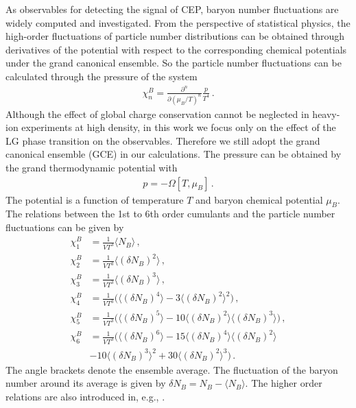 \documentclass[aps,twocolumn,prd,superscriptaddress,nofootinbib,floatfix]{revtex4-2}
\begin{document}
As observables for detecting the signal of CEP, baryon number fluctuations are widely computed and investigated. From the perspective of statistical physics, the high-order fluctuations of particle number distributions can be obtained through derivatives of the potential with respect to the corresponding chemical potentials under the grand canonical ensemble. So the particle number fluctuations can be calculated through the pressure of the system
%
\begin{align}\label{eq:chi}
\chi^B_n=\frac{\partial^n}{\partial(\mu_B/T)^n}\frac{p}{T^4}\,.
\end{align}
%
Although the effect of global charge conservation cannot be neglected in heavy-ion experiments at high density, in this work we focus only on the effect of the LG phase transition on the observables. Therefore we still adopt the grand canonical ensemble (GCE) in our calculations. The pressure can be obtained by the grand thermodynamic potential with 
%
\begin{align}\label{eq:p_omega}
p=-\Omega[T,\mu_B]\,.
\end{align}
%
The potential is a function of temperature $T$ and baryon chemical potential $\mu_B$. The relations between the 1st to 6th order cumulants and the particle number fluctuations can be given by
%
\begin{align}
    \chi^B_1&=\frac{1}{VT^3}\langle N_B\rangle\,,\\[2ex]
    \chi^B_2&=\frac{1}{VT^3}\langle (\delta N_B)^2\rangle\,,\\[2ex]
    \chi^B_3&=\frac{1}{VT^3}\langle (\delta N_B)^3\rangle\,,\\[2ex]
    \chi^B_4&=\frac{1}{VT^3}\bigg(\langle (\delta N_B)^4\rangle-3\langle (\delta N_B)^2\rangle^2\bigg)\,,\\[2ex]
    \chi^B_5&=\frac{1}{VT^3}\bigg(\langle(\delta N_B)^5\rangle-10\langle(\delta N_B)^2\rangle\langle(\delta N_B)^3\rangle\bigg)\,,\\[2ex]
    \chi^B_6&=\frac{1}{VT^3}\bigg(\langle(\delta N_B)^6\rangle-15\langle(\delta N_B)^4\rangle\langle(\delta N_B)^2\rangle\\[2ex]
    &-10\langle(\delta N_B)^3\rangle^2+30\langle(\delta N_B)^2\rangle^3\bigg)\,.
\end{align}
%
The angle brackets denote the ensemble average. The fluctuation of the baryon number around its average is given by $\delta N_B=N_B-\langle N_B\rangle$. The higher order relations are also introduced in, e.g., \cite{Fu:2021oaw,Luo:2017faz}.
\end{document}
